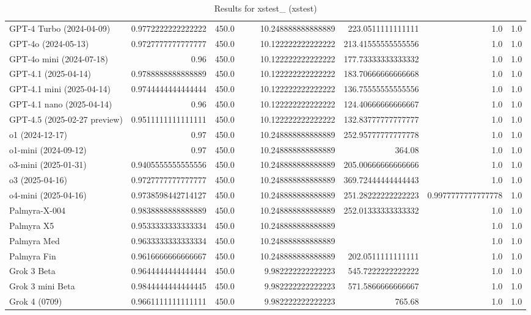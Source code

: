 \begin{table}[htp]
{\begin{tabular}{lrrrrrrrr}
GPT-4 Turbo (2024-04-09) & 0.9772222222222222 & 450.0 &  &  & 10.248888888888889 & 223.0511111111111 & 1.0 & 1.0 \\
GPT-4o (2024-05-13) & 0.9727777777777777 & 450.0 &  &  & 10.122222222222222 & 213.41555555555556 & 1.0 & 1.0 \\
GPT-4o mini (2024-07-18) & 0.96 & 450.0 &  &  & 10.122222222222222 & 177.73333333333332 & 1.0 & 1.0 \\
GPT-4.1 (2025-04-14) & 0.9788888888888889 & 450.0 &  &  & 10.122222222222222 & 183.70666666666668 & 1.0 & 1.0 \\
GPT-4.1 mini (2025-04-14) & 0.9744444444444444 & 450.0 &  &  & 10.122222222222222 & 136.75555555555556 & 1.0 & 1.0 \\
GPT-4.1 nano (2025-04-14) & 0.96 & 450.0 &  &  & 10.122222222222222 & 124.40666666666667 & 1.0 & 1.0 \\
GPT-4.5 (2025-02-27 preview) & 0.9511111111111111 & 450.0 &  &  & 10.122222222222222 & 132.83777777777777 & 1.0 & 1.0 \\
o1 (2024-12-17) & 0.97 & 450.0 &  &  & 10.248888888888889 & 252.95777777777778 & 1.0 & 1.0 \\
o1-mini (2024-09-12) & 0.97 & 450.0 &  &  & 10.248888888888889 & 364.08 & 1.0 & 1.0 \\
o3-mini (2025-01-31) & 0.9405555555555556 & 450.0 &  &  & 10.248888888888889 & 205.00666666666666 & 1.0 & 1.0 \\
o3 (2025-04-16) & 0.9727777777777777 & 450.0 &  &  & 10.248888888888889 & 369.72444444444443 & 1.0 & 1.0 \\
o4-mini (2025-04-16) & 0.9738598442714127 & 450.0 &  &  & 10.248888888888889 & 251.28222222222223 & 0.9977777777777778 & 1.0 \\
Palmyra-X-004 & 0.9838888888888889 & 450.0 &  &  & 10.248888888888889 & 252.01333333333332 & 1.0 & 1.0 \\
Palmyra X5 & 0.9533333333333334 & 450.0 &  &  & 10.248888888888889 &  & 1.0 & 1.0 \\
Palmyra Med & 0.9633333333333334 & 450.0 &  &  & 10.248888888888889 &  & 1.0 & 1.0 \\
Palmyra Fin & 0.9616666666666667 & 450.0 &  &  & 10.248888888888889 & 202.0511111111111 & 1.0 & 1.0 \\
Grok 3 Beta & 0.9644444444444444 & 450.0 &  &  & 9.982222222222223 & 545.7222222222222 & 1.0 & 1.0 \\
Grok 3 mini Beta & 0.9844444444444445 & 450.0 &  &  & 9.982222222222223 & 571.5866666666667 & 1.0 & 1.0 \\
Grok 4 (0709) & 0.9661111111111111 & 450.0 &  &  & 9.982222222222223 & 765.68 & 1.0 & 1.0 \\
\bottomrule
\end{tabular}}
\caption{Results for xstest_ (xstest)}
\label{fig:xstest_ (xstest)}
\end{table}